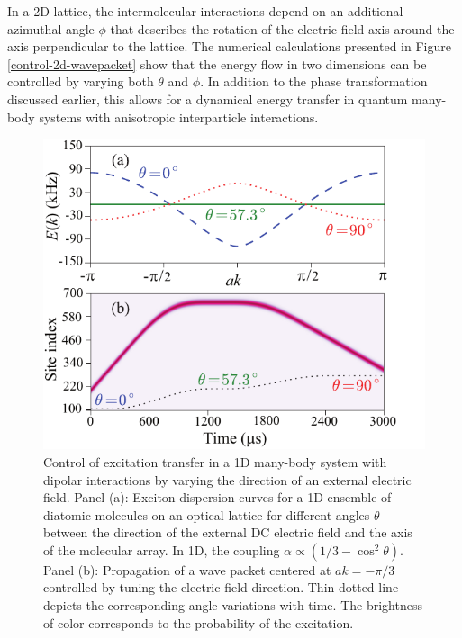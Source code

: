 In a 2D lattice, the intermolecular interactions depend on an additional azimuthal angle $\phi$ that describes
 the rotation of the electric field axis around the axis perpendicular to the lattice. The numerical calculations 
presented in Figure \ref{control-2d-wavepacket} show that the energy flow in two dimensions can be  
controlled by varying both $\theta$ and $\phi$. 
In addition to the phase transformation discussed earlier, this allows for a dynamical energy transfer in quantum 
many-body systems with anisotropic interparticle interactions.



\begin{figure}[htbp]
\centering
\includegraphics[width=\linewidth]{control-exciton.pdf}
\caption{ Control of excitation transfer in a 1D many-body system with dipolar interactions by varying the 
direction of an external electric field.
Panel (a): Exciton dispersion curves for a 1D
ensemble  of diatomic molecules on an optical lattice for
different angles $\theta$ between the direction of the external DC
electric field and the axis of the molecular array.  In 1D, the coupling $\alpha\propto (1/3 - \cos^2\theta)$.  Panel (b):
Propagation of a wave packet centered at $ak =-\pi/3$ controlled
by tuning the electric field direction. Thin dotted line depicts
the corresponding angle variations with time. The brightness
of color corresponds to the probability of the excitation. }
\label{control-exciton}
\end{figure}

